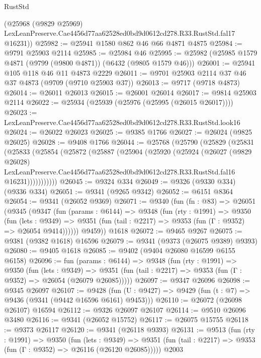 \begin{lexlean}{RustStd}
\begin{coremodule}
      (@25968
        (@9829 @25969)
        LexLeanPreserve.Cae4456d77aa62528ed0bd9d0612cd278.R33.RustStd.fal17
        @16231))
@25982 := @25941 @1580 @862 @46 @66 @4871 @4875
@25984 := @9791 @25903 @2114
@25985 := @25984 @46
@25995 := @25982 (@25985 @1579 @4871 (@9799 (@9800 @4871)) (@6432 (@9805 @1579 @46)))
@26001 := @25941 @105 @118 @46 @11 @4873 @2229
@26011 := @9701 @25903 @2114 @37 @46 @37 @4873 (@9709 (@9710 @25903 @37))
@26013 := @9717 (@9718 @4873)
@26014 := @26011 @26013
@26015 := @26001 @26014
@26017 := @9814 @25903 @2114
@26022 := @25934 (@25939 (@25976 (@25995 (@26015 @26017))))
@26023 := LexLeanPreserve.Cae4456d77aa62528ed0bd9d0612cd278.R33.RustStd.look16
@26024 := @26022 @26023
@26025 := @9385 @1766
@26027 := @26024 (@9825 @26025)
@26028 := @9408 @1766
@26044 := @25768
    (@25790
      (@25829
        (@25831
          (@25833
            (@25854
              (@25872
                (@25887
                  (@25904
                    (@25920
                      (@25924
                        (@26027
                          (@9829 @26028)
                          LexLeanPreserve.Cae4456d77aa62528ed0bd9d0612cd278.R33.RustStd.fal16
                          @16231)))))))))))
@26045 := @9324 @334
@26049 := @9326 (@9330 @334) (@9336 @334)
@26051 := @9341 (@9265 @9342)
@26052 := @6151 @8364
@26054 := @9341 (@26052 @9369)
@26071 := @9340
    (fun (fn : @83) =>
    @26051
      (@9345
        (@9347
          (fun (params : @6144) =>
          @9348
            (fun (rty : @1991) =>
            @9350
              (fun (lets : @9349) =>
              @9351 (fun (tail : @2217) => @9353 (fun (Γ : @9352) => @26054 @9414))))))
        @9459))
    @1618
@26072 := @9465 @9267
@26075 := @9381 (@9382 @1618) @16596
@26079 := @9341 (@9373 (@26075 @9389) @9393)
@26080 := @9405 @1618
@26085 := @9402 (@9404 @26080 @16599 @6155 @6158)
@26096 := fun (params : @6144) =>
  @9348
    (fun (rty : @1991) =>
    @9350
      (fun (lets : @9349) =>
      @9351 (fun (tail : @2217) => @9353 (fun (Γ : @9352) => @26054 (@26079 @26085)))))
@26097 := @9347 @26096
@26098 := @9345 @26097
@26107 := @9428
    (fun (U : @9427) => @9429 (fun (t : @7) => @9436 (@9341 (@9442 @16596 @6161) @9453)))
@26110 := @26072 (@26098 @26107) @16594
@26112 := @9326 @26097 @26107
@26114 := @9510 @26096 @3480
@26116 := @9341 (@26052 @15752)
@26117 := @26075 @15755
@26118 := @9373 @26117
@26120 := @9341 (@26118 @9393)
@26131 := @9513
    (fun (rty : @1991) =>
    @9350
      (fun (lets : @9349) =>
      @9351 (fun (tail : @2217) => @9353 (fun (Γ : @9352) => @26116 (@26120 @26085)))))
    @2003

\end{coremodule}
\end{lexlean}
